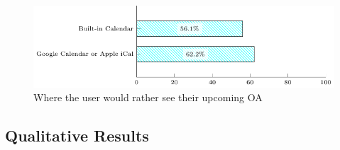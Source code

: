 \begin{figure}[!htb]
  \caption{Where the user would rather see their upcoming \ac{OA}}\label{fig:participant-a14}
  \begin{center}
    \includegraphics[width=13cm]{img/5-questions-participant-A14-1.pdf}
  \end{center}
\end{figure}

\subsection{Qualitative Results}\label{sec:survey-quali}

